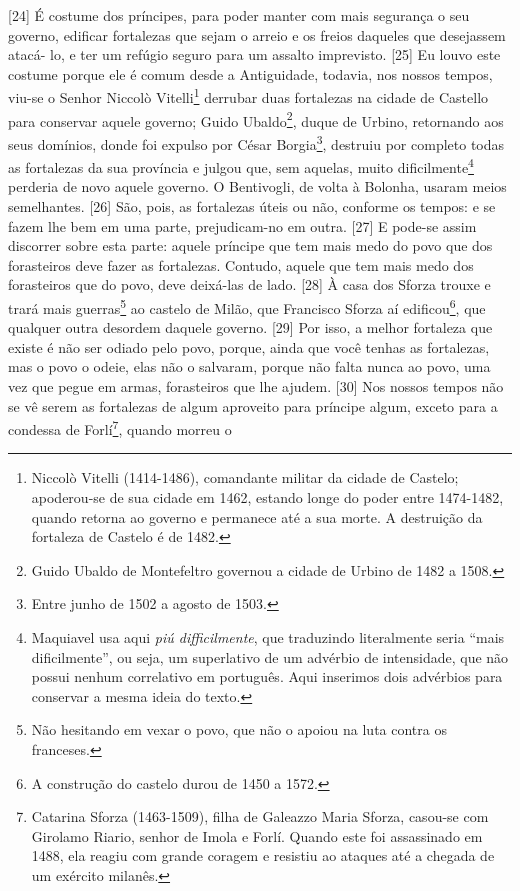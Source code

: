 {[}24{]} É costume dos príncipes, para poder manter com mais segurança o
seu governo, edificar fortalezas que sejam o arreio e os freios daqueles
que desejassem atacá- lo, e ter um refúgio seguro para um assalto
imprevisto. {[}25{]} Eu louvo este costume porque ele é comum desde a
Antiguidade, todavia, nos nossos tempos, viu-se o Senhor Niccolò
Vitelli\footnote{Niccolò Vitelli (1414-1486), comandante militar da
  cidade de Castelo; apoderou-se de sua cidade em 1462, estando longe do
  poder entre 1474-1482, quando retorna ao governo e permanece até a sua
  morte. A destruição da fortaleza de Castelo é de 1482.} derrubar duas
fortalezas na cidade de Castello para conservar aquele governo; Guido
Ubaldo\footnote{Guido Ubaldo de Montefeltro governou a cidade de Urbino
  de 1482 a 1508.}, duque de Urbino, retornando aos seus domínios, donde
foi expulso por César Borgia\footnote{Entre junho de 1502 a agosto de
  1503.}, destruiu por completo todas as fortalezas da sua província e
julgou que, sem aquelas, muito dificilmente\footnote{Maquiavel usa aqui
  \emph{piú difficilmente}, que traduzindo literalmente seria ``mais
  dificilmente'', ou seja, um superlativo de um advérbio de intensidade,
  que não possui nenhum correlativo em português. Aqui inserimos dois
  advérbios para conservar a mesma ideia do texto.} perderia de novo
aquele governo. O Bentivogli, de volta à Bolonha, usaram meios
semelhantes. {[}26{]} São, pois, as fortalezas úteis ou não, conforme os
tempos: e se fazem lhe bem em uma parte, prejudicam-no em outra.
{[}27{]} E pode-se assim discorrer sobre esta parte: aquele príncipe que
tem mais medo do povo que dos forasteiros deve fazer as fortalezas.
Contudo, aquele que tem mais medo dos forasteiros que do povo, deve
deixá-las de lado. {[}28{]} À casa dos Sforza trouxe e trará mais
guerras\footnote{Não hesitando em vexar o povo, que não o apoiou na luta
  contra os franceses.} ao castelo de Milão, que Francisco Sforza aí
edificou\footnote{A construção do castelo durou de 1450 a 1572.}, que
qualquer outra desordem daquele governo. {[}29{]} Por isso, a melhor
fortaleza que existe é não ser odiado pelo povo, porque, ainda que você
tenhas as fortalezas, mas o povo o odeie, elas não o salvaram, porque
não falta nunca ao povo, uma vez que pegue em armas, forasteiros que lhe
ajudem. {[}30{]} Nos nossos tempos não se vê serem as fortalezas de
algum aproveito para príncipe algum, exceto para a condessa de
Forlí\footnote{Catarina Sforza (1463-1509), filha de Galeazzo Maria
  Sforza, casou-se com Girolamo Riario, senhor de Imola e Forlí. Quando
  este foi assassinado em 1488, ela reagiu com grande coragem e resistiu
  ao ataques até a chegada de um exército milanês.}, quando morreu o
